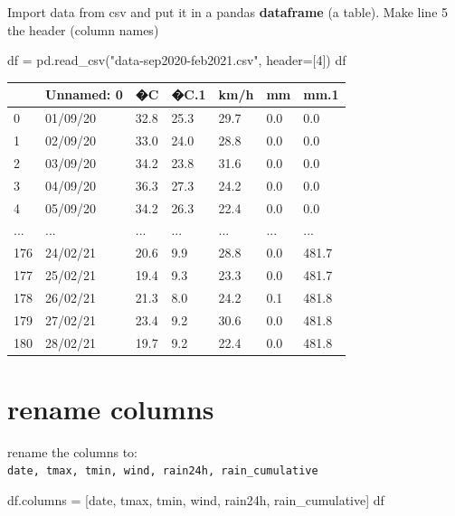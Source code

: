 \documentclass[
  letterpaper,
  DIV=11,
  numbers=noendperiod]{scrreprt}
\newenvironment{Shaded}{\begin{snugshade}}{\end{snugshade}}
\newcommand{\DecValTok}[1]{\textcolor[rgb]{0.68,0.00,0.00}{#1}}
\newcommand{\NormalTok}[1]{\textcolor[rgb]{0.00,0.23,0.31}{#1}}
\newcommand{\OperatorTok}[1]{\textcolor[rgb]{0.37,0.37,0.37}{#1}}
\newcommand{\StringTok}[1]{\textcolor[rgb]{0.13,0.47,0.30}{#1}}
\begin{document}
Import data from csv and put it in a pandas \textbf{dataframe} (a
table). Make line 5 the header (column names)

\begin{Shaded}
\begin{Highlighting}[]
\NormalTok{df }\OperatorTok{=}\NormalTok{ pd.read\_csv(}\StringTok{"data{-}sep2020{-}feb2021.csv"}\NormalTok{, header}\OperatorTok{=}\NormalTok{[}\DecValTok{4}\NormalTok{])}
\NormalTok{df}
\end{Highlighting}
\end{Shaded}

\begin{longtable}[]{@{}lllllll@{}}
\toprule()
& Unnamed: 0 & �C & �C.1 & km/h & mm & mm.1 \\
\midrule()
\endhead
0 & 01/09/20 & 32.8 & 25.3 & 29.7 & 0.0 & 0.0 \\
1 & 02/09/20 & 33.0 & 24.0 & 28.8 & 0.0 & 0.0 \\
2 & 03/09/20 & 34.2 & 23.8 & 31.6 & 0.0 & 0.0 \\
3 & 04/09/20 & 36.3 & 27.3 & 24.2 & 0.0 & 0.0 \\
4 & 05/09/20 & 34.2 & 26.3 & 22.4 & 0.0 & 0.0 \\
... & ... & ... & ... & ... & ... & ... \\
176 & 24/02/21 & 20.6 & 9.9 & 28.8 & 0.0 & 481.7 \\
177 & 25/02/21 & 19.4 & 9.3 & 23.3 & 0.0 & 481.7 \\
178 & 26/02/21 & 21.3 & 8.0 & 24.2 & 0.1 & 481.8 \\
179 & 27/02/21 & 23.4 & 9.2 & 30.6 & 0.0 & 481.8 \\
180 & 28/02/21 & 19.7 & 9.2 & 22.4 & 0.0 & 481.8 \\
\bottomrule()
\end{longtable}

\hypertarget{rename-columns}{%
\section{rename columns}\label{rename-columns}}

rename the columns to:\\
\texttt{date,\ tmax,\ tmin,\ wind,\ rain24h,\ rain\_cumulative}

\begin{Shaded}
\begin{Highlighting}[]
\NormalTok{df.columns }\OperatorTok{=}\NormalTok{ [}\StringTok{\textquotesingle{}date\textquotesingle{}}\NormalTok{, }\StringTok{\textquotesingle{}tmax\textquotesingle{}}\NormalTok{, }\StringTok{\textquotesingle{}tmin\textquotesingle{}}\NormalTok{, }\StringTok{\textquotesingle{}wind\textquotesingle{}}\NormalTok{, }\StringTok{\textquotesingle{}rain24h\textquotesingle{}}\NormalTok{, }\StringTok{\textquotesingle{}rain\_cumulative\textquotesingle{}}\NormalTok{]}
\NormalTok{df}
\end{Highlighting}
\end{Shaded}
\end{document}
